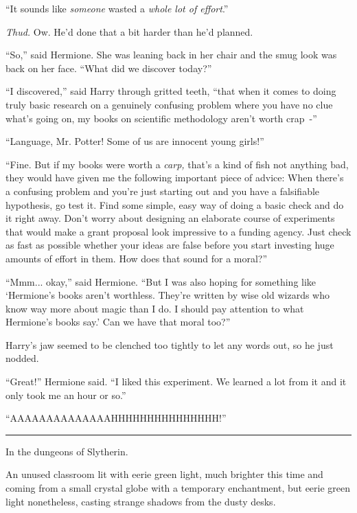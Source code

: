 ``It sounds like \emph{someone} wasted a \emph{whole lot of effort}.''

\emph{Thud.} Ow. He'd done that a bit harder than he'd planned.

``So,'' said Hermione. She was leaning back in her chair and the smug look was back on her face. ``What did we discover today?''

``I discovered,'' said Harry through gritted teeth, ``that when it comes to doing truly basic research on a genuinely confusing problem where you have no clue what's going on, my books on scientific methodology aren't worth crap~-''

``Language, Mr. Potter! Some of us are innocent young girls!''

``Fine. But if my books were worth a \emph{carp,} that's a kind of fish not anything bad, they would have given me the following important piece of advice: When there's a confusing problem and you're just starting out and you have a falsifiable hypothesis, go test it. Find some simple, easy way of doing a basic check and do it right away. Don't worry about designing an elaborate course of experiments that would make a grant proposal look impressive to a funding agency. Just check as fast as possible whether your ideas are false before you start investing huge amounts of effort in them. How does that sound for a moral?''

``Mmm... okay,'' said Hermione. ``But I was also hoping for something like `Hermione's books aren't worthless. They're written by wise old wizards who know way more about magic than I do. I should pay attention to what Hermione's books say.' Can we have that moral too?''

Harry's jaw seemed to be clenched too tightly to let any words out, so he just nodded.

``Great!'' Hermione said. ``I liked this experiment. We learned a lot from it and it only took me an hour or so.''

``AAAAAAAAAAAAAAHHHHHHHHHHHHHHH!''

\begin{center}\rule{3in}{0.4pt}\end{center}

In the dungeons of Slytherin.

An unused classroom lit with eerie green light, much brighter this time and coming from a small crystal globe with a temporary enchantment, but eerie green light nonetheless, casting strange shadows from the dusty desks.

